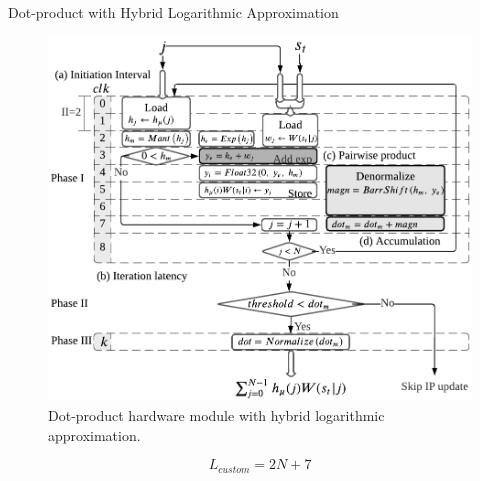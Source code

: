 \begin{frame}{Dot-product with Hybrid Logarithmic Approximation}
	\begin{figure}
		\centering
		\includegraphics[width=0.4\columnwidth]{../chapters/sbs_accelerator/figures/dot_product_log.pdf}
		\caption{\scriptsize Dot-product hardware module with hybrid logarithmic approximation.}
	\end{figure}
	\scriptsize
	
	\vfill %
	
	\[
	L_{custom}=2N+7
	\]
\end{frame}

